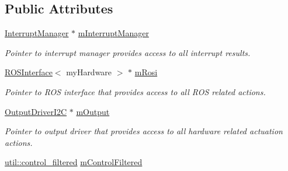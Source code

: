\subsection*{Public Attributes}
\begin{DoxyCompactItemize}
\item 
\hyperlink{classSPMB_1_1InterruptManager}{Interrupt\+Manager} $\ast$ \hyperlink{classSPMB_1_1StateMachine_a3e5c36f8ceb94e6f8913e7475cce2c40}{m\+Interrupt\+Manager}\hypertarget{classSPMB_1_1StateMachine_a3e5c36f8ceb94e6f8913e7475cce2c40}{}\label{classSPMB_1_1StateMachine_a3e5c36f8ceb94e6f8913e7475cce2c40}

\begin{DoxyCompactList}\small\item\em Pointer to interrupt manager provides access to all interrupt results. \end{DoxyCompactList}\item 
\hyperlink{classSPMB_1_1ROSInterface}{R\+O\+S\+Interface}$<$ my\+Hardware $>$ $\ast$ \hyperlink{classSPMB_1_1StateMachine_ab653add6890a51701f9d3a3760008e15}{m\+Rosi}\hypertarget{classSPMB_1_1StateMachine_ab653add6890a51701f9d3a3760008e15}{}\label{classSPMB_1_1StateMachine_ab653add6890a51701f9d3a3760008e15}

\begin{DoxyCompactList}\small\item\em Pointer to R\+OS interface that provides access to all R\+OS related actions. \end{DoxyCompactList}\item 
\hyperlink{classSPMB_1_1OutputDriverI2C}{Output\+Driver\+I2C} $\ast$ \hyperlink{classSPMB_1_1StateMachine_aecac5b27c3a5daa5331d367f55bed915}{m\+Output}\hypertarget{classSPMB_1_1StateMachine_aecac5b27c3a5daa5331d367f55bed915}{}\label{classSPMB_1_1StateMachine_aecac5b27c3a5daa5331d367f55bed915}

\begin{DoxyCompactList}\small\item\em Pointer to output driver that provides access to all hardware related actuation actions. \end{DoxyCompactList}\item 
\hyperlink{structSPMB_1_1util_1_1control__filtered}{util\+::control\+\_\+filtered} \hyperlink{classSPMB_1_1StateMachine_ac073bedbf77604e5df582b14e2a610cb}{m\+Control\+Filtered}\hypertarget{classSPMB_1_1StateMachine_ac073bedbf77604e5df582b14e2a610cb}{}\label{classSPMB_1_1StateMachine_ac073bedbf77604e5df582b14e2a610cb}


\end{DoxyCompactItemize}
